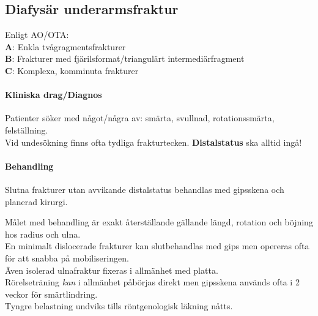 \documentclass[
  letterpaper,
  DIV=11,
  numbers=noendperiod]{scrreport}
\let\oldparagraph\paragraph
\renewcommand{\paragraph}[1]{\oldparagraph{#1}\mbox{}}
\begin{document}
\hypertarget{sec-diafysuxe4runderarmsfraktur}{%
\subsection{Diafysär
underarmsfraktur}\label{sec-diafysuxe4runderarmsfraktur}}

\begin{tcolorbox}[enhanced jigsaw, colback=white, colbacktitle=quarto-callout-tip-color!10!white, toptitle=1mm, arc=.35mm, toprule=.15mm, rightrule=.15mm, titlerule=0mm, breakable, bottomrule=.15mm, colframe=quarto-callout-tip-color-frame, left=2mm, opacityback=0, coltitle=black, title=\textcolor{quarto-callout-tip-color}{\faLightbulb}\hspace{0.5em}{Klassifikation}, leftrule=.75mm, bottomtitle=1mm, opacitybacktitle=0.6]

Enligt AO/OTA:\\
\textbf{A}: Enkla tvågragmentsfrakturer\\
\textbf{B}: Frakturer med fjärilsformat/triangulärt
intermediärfragment\\
\textbf{C}: Komplexa, komminuta frakturer

\end{tcolorbox}

\hypertarget{kliniska-dragdiagnos-4}{%
\paragraph{Kliniska drag/Diagnos}\label{kliniska-dragdiagnos-4}}

Patienter söker med något/några av: smärta, svullnad, rotationssmärta,
felställning.\\
Vid undesökning finns ofta tydliga frakturtecken. \textbf{Distalstatus}
ska alltid ingå!

\hypertarget{behandling-4}{%
\paragraph{Behandling}\label{behandling-4}}

Slutna frakturer utan avvikande distalstatus behandlas med gipsskena och
planerad kirurgi.

Målet med behandling är exakt återställande gällande längd, rotation och
böjning hos radius och ulna.\\
En minimalt dislocerade frakturer kan slutbehandlas med gips men
opereras ofta för att snabba på mobiliseringen.\\
Även isolerad ulnafraktur fixeras i allmänhet med platta.\\
Rörelseträning \emph{kan} i allmänhet påbörjas direkt men gipsskena
används ofta i 2 veckor för smärtlindring.\\
Tyngre belastning undviks tills röntgenologisk läkning nåtts.
\end{document}
